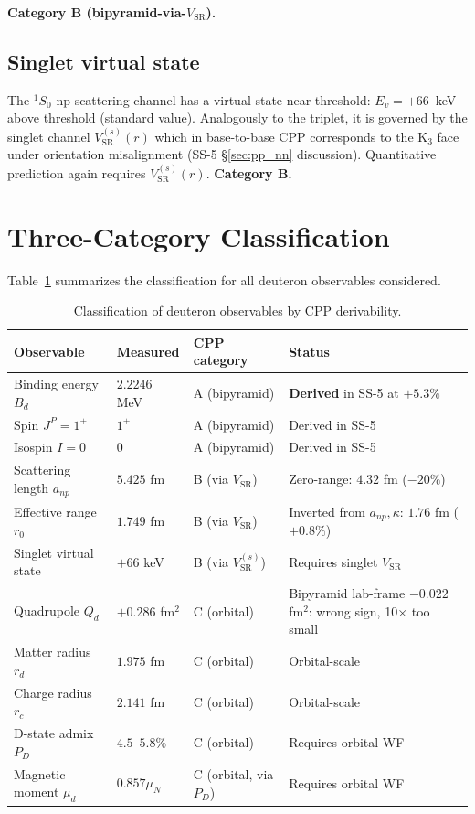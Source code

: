 \documentclass[11pt,letterpaper]{article}
\newcommand{\Bd}{B_{d}}
\newcommand{\Qd}{Q_{d}}
\newcommand{\PD}{P_{D}}
\newcommand{\mud}{\mu_{d}}
\newcommand{\anp}{a_{np}}
\newcommand{\rzero}{r_{0}}
\newcommand{\VSR}{V_{\mathrm{SR}}}
\begin{document}
\textbf{Category B (bipyramid-via-$\VSR$).}

\subsection{Singlet virtual state}

The $^1S_0$ np scattering channel has a virtual state near threshold: $E_v = +66$~keV above threshold (standard value). Analogously to the triplet, it is governed by the singlet channel $\VSR^{(s)}(r)$ which in base-to-base CPP corresponds to the K$_3$ face under orientation misalignment (SS-5 §\ref{sec:pp_nn} discussion). Quantitative prediction again requires $\VSR^{(s)}(r)$. \textbf{Category B.}

\section{Three-Category Classification}
\label{sec:classification}

Table~\ref{tab:classification} summarizes the classification for all deuteron observables considered.

\begin{table}[H]
\centering
\caption{Classification of deuteron observables by CPP derivability.}
\label{tab:classification}
\small
\begin{tabular}{@{}p{}p{}p{}p{}@{}}
\toprule
\textbf{Observable} & \textbf{Measured} & \textbf{CPP category} & \textbf{Status} \\
\midrule
Binding energy $\Bd$ & $2.2246$ MeV & A (bipyramid) & \textbf{Derived} in SS-5 at $+5.3\%$ \\
Spin $J^P = 1^+$ & $1^+$ & A (bipyramid) & Derived in SS-5 \\
Isospin $I = 0$ & $0$ & A (bipyramid) & Derived in SS-5 \\
Scattering length $\anp$ & $5.425$ fm & B (via $\VSR$) & Zero-range: $4.32$ fm ($-20\%$) \\
Effective range $\rzero$ & $1.749$ fm & B (via $\VSR$) & Inverted from $\anp, \kappa$: $1.76$ fm ($+0.8\%$) \\
Singlet virtual state & $+66$ keV & B (via $\VSR^{(s)}$) & Requires singlet $\VSR$ \\
Quadrupole $\Qd$ & $+0.286$ fm$^2$ & C (orbital) & Bipyramid lab-frame $-0.022$ fm$^2$: wrong sign, 10$\times$ too small \\
Matter radius $r_d$ & $1.975$ fm & C (orbital) & Orbital-scale \\
Charge radius $r_c$ & $2.141$ fm & C (orbital) & Orbital-scale \\
D-state admix $\PD$ & $4.5$--$5.8\%$ & C (orbital) & Requires orbital WF \\
Magnetic moment $\mud$ & $0.857 \mu_N$ & C (orbital, via $\PD$) & Requires orbital WF \\
\bottomrule
\end{tabular}
\end{table}
\end{document}
